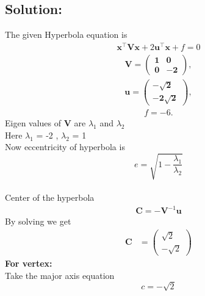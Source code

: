 \documentclass[10pt,a4paper]{report}
\newcommand{\myvec}[1]{\ensuremath{\begin{pmatrix}#1\end{pmatrix}}}
\let\vec\mathbf
\begin{document}
\begin{multicols}{2}
\section*{Solution:}
The given Hyperbola equation is 
\vspace{0.25cm}
\begin{align}
\vec{x}^{\top}\vec{V}\vec{x}+2\vec{u}^{\top}\vec{x}+f=0
\end{align}
\begin{align}
\vec{V}=\vec{ \begin{pmatrix}1 & 0 \\ 0 & -2 \end{pmatrix}}, 
\end{align}
\begin{align}
\vec{u}=\vec{ \begin{pmatrix}-\sqrt{2} \\ -2\sqrt{2} \end{pmatrix}},
\end{align}
\begin{align}
f = -6.
\end{align}
Eigen values of $\vec{V}$ are $\lambda_1$ and $\lambda_2$
\vspace{0.25cm}\\
Here $\lambda_1$ = -2  , $\lambda_2$ = 1
\vspace{0.25cm}\\
Now eccentricity of hyperbola is 
\vspace{0.25cm}\\
\begin{equation}
e=\sqrt{1-\frac{\lambda_1}{\lambda_2}}
\end{equation}
\vspace{0.25cm}\\
Center of the hyperbola
\begin{align}
\vec{C}=-\vec{V}^{-1}\vec{u}
\end{align}
By solving we get
\begin{align} 
\vec{C} &= \myvec{\sqrt{2} \\ -\sqrt{2}} 
\end{align}
\textbf{For vertex:}
\vspace{0.25cm}\\
Take the major axis equation 
\begin{equation}
c=-\sqrt{2}
\end{equation}
\vspace{0.25cm}\\

\end{multicols}
\end{document}
